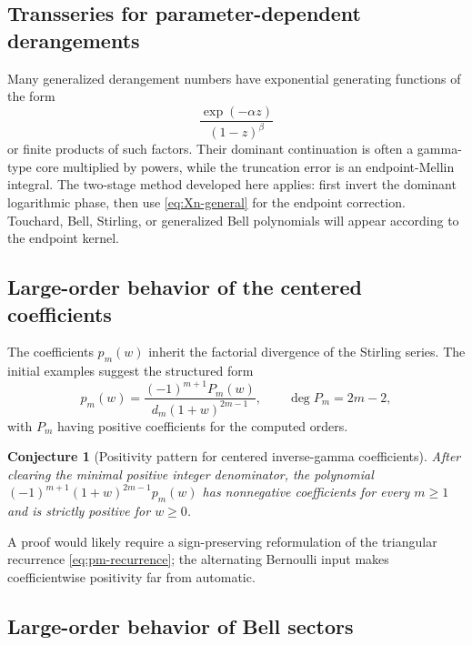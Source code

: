 \documentclass[11pt,a4paper]{article}
\numberwithin{equation}{section}
\newtheorem{conjecture}[theorem]{Conjecture}
\theoremstyle{definition}
\theoremstyle{remark}
\begin{document}
\subsection{Transseries for parameter-dependent derangements}

Many generalized derangement numbers have exponential generating functions
of the form
\begin{equation}\label{eq:generalized-derangement-egf}
 \frac{\exp(-\alpha z)}{(1-z)^\beta}
\end{equation}
or finite products of such factors.  Their dominant continuation is often a
gamma-type core multiplied by powers, while the truncation error is an
endpoint-Mellin integral.  The two-stage method developed here applies:
first invert the dominant logarithmic phase, then use
\eqref{eq:Xn-general} for the endpoint correction.  Touchard, Bell,
Stirling, or generalized Bell polynomials will appear according to the
endpoint kernel.

\subsection{Large-order behavior of the centered coefficients}

The coefficients $p_m(w)$ inherit the factorial divergence of the Stirling
series.  The initial examples suggest the structured form
\begin{equation}\label{eq:pm-structure}
 p_m(w)=\frac{(-1)^{m+1}P_m(w)}{d_m(1+w)^{2m-1}},
 \qquad \deg P_m=2m-2,
\end{equation}
with $P_m$ having positive coefficients for the computed orders.

\begin{conjecture}[Positivity pattern for centered inverse-gamma coefficients]
\label{conj:pm-positive}
After clearing the minimal positive integer denominator, the polynomial
$(-1)^{m+1}(1+w)^{2m-1}p_m(w)$ has nonnegative coefficients for every
$m\ge1$ and is strictly positive for $w\ge0$.
\end{conjecture}

A proof would likely require a sign-preserving reformulation of the
triangular recurrence \eqref{eq:pm-recurrence}; the alternating Bernoulli
input makes coefficientwise positivity far from automatic.

\subsection{Large-order behavior of Bell sectors}
\end{document}
